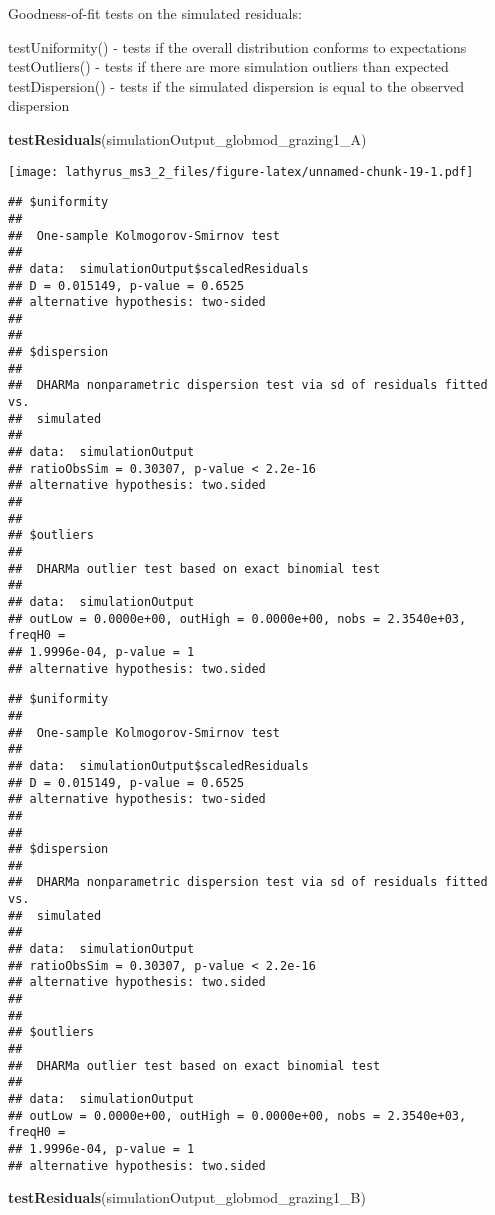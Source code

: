 \documentclass[
]{article}
\newenvironment{Shaded}{\begin{snugshade}}{\end{snugshade}}
\newcommand{\KeywordTok}[1]{\textcolor[rgb]{0.13,0.29,0.53}{\textbf{#1}}}
\newcommand{\NormalTok}[1]{#1}
\begin{document}
Goodness-of-fit tests on the simulated residuals:

testUniformity() - tests if the overall distribution conforms to
expectations testOutliers() - tests if there are more simulation
outliers than expected testDispersion() - tests if the simulated
dispersion is equal to the observed dispersion

\begin{Shaded}
\begin{Highlighting}[]
\KeywordTok{testResiduals}\NormalTok{(simulationOutput_globmod_grazing1_A)}
\end{Highlighting}
\end{Shaded}

\texttt{[image: lathyrus\_ms3\_2\_files/figure-latex/unnamed-chunk-19-1.pdf]}

\begin{verbatim}
## $uniformity
## 
##  One-sample Kolmogorov-Smirnov test
## 
## data:  simulationOutput$scaledResiduals
## D = 0.015149, p-value = 0.6525
## alternative hypothesis: two-sided
## 
## 
## $dispersion
## 
##  DHARMa nonparametric dispersion test via sd of residuals fitted vs.
##  simulated
## 
## data:  simulationOutput
## ratioObsSim = 0.30307, p-value < 2.2e-16
## alternative hypothesis: two.sided
## 
## 
## $outliers
## 
##  DHARMa outlier test based on exact binomial test
## 
## data:  simulationOutput
## outLow = 0.0000e+00, outHigh = 0.0000e+00, nobs = 2.3540e+03, freqH0 =
## 1.9996e-04, p-value = 1
## alternative hypothesis: two.sided
\end{verbatim}

\begin{verbatim}
## $uniformity
## 
##  One-sample Kolmogorov-Smirnov test
## 
## data:  simulationOutput$scaledResiduals
## D = 0.015149, p-value = 0.6525
## alternative hypothesis: two-sided
## 
## 
## $dispersion
## 
##  DHARMa nonparametric dispersion test via sd of residuals fitted vs.
##  simulated
## 
## data:  simulationOutput
## ratioObsSim = 0.30307, p-value < 2.2e-16
## alternative hypothesis: two.sided
## 
## 
## $outliers
## 
##  DHARMa outlier test based on exact binomial test
## 
## data:  simulationOutput
## outLow = 0.0000e+00, outHigh = 0.0000e+00, nobs = 2.3540e+03, freqH0 =
## 1.9996e-04, p-value = 1
## alternative hypothesis: two.sided
\end{verbatim}

\begin{Shaded}
\begin{Highlighting}[]
\KeywordTok{testResiduals}\NormalTok{(simulationOutput_globmod_grazing1_B)}
\end{Highlighting}
\end{Shaded}
\end{document}
